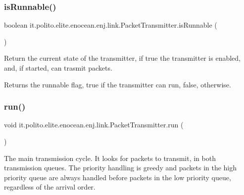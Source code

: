 \subsubsection{\texorpdfstring{is\+Runnable()}{isRunnable()}}
{\footnotesize\ttfamily boolean it.\+polito.\+elite.\+enocean.\+enj.\+link.\+Packet\+Transmitter.\+is\+Runnable (\begin{DoxyParamCaption}{ }\end{DoxyParamCaption})}

Return the current state of the transmitter, if true the transmitter is enabled, and, if started, can trasmit packets.

\begin{DoxyReturn}{Returns}
the runnable flag, true if the transmitter can run, false, otherwise. 
\end{DoxyReturn}
\hypertarget{classit_1_1polito_1_1elite_1_1enocean_1_1enj_1_1link_1_1_packet_transmitter_a98eebf065023d743467f12913be4cd05}{}\label{classit_1_1polito_1_1elite_1_1enocean_1_1enj_1_1link_1_1_packet_transmitter_a98eebf065023d743467f12913be4cd05} 
\subsubsection{\texorpdfstring{run()}{run()}}
{\footnotesize\ttfamily void it.\+polito.\+elite.\+enocean.\+enj.\+link.\+Packet\+Transmitter.\+run (\begin{DoxyParamCaption}{ }\end{DoxyParamCaption})}

The main transmission cycle. It looks for packets to transmit, in both transmission queues. The priority handling is greedy and packets in the high priority queue are always handled before packets in the low priority queue, regardless of the arrival order. \hypertarget{classit_1_1polito_1_1elite_1_1enocean_1_1enj_1_1link_1_1_packet_transmitter_a6d97c348081325158bd008ac36c67fc6}{}\label{classit_1_1polito_1_1elite_1_1enocean_1_1enj_1_1link_1_1_packet_transmitter_a6d97c348081325158bd008ac36c67fc6} 
